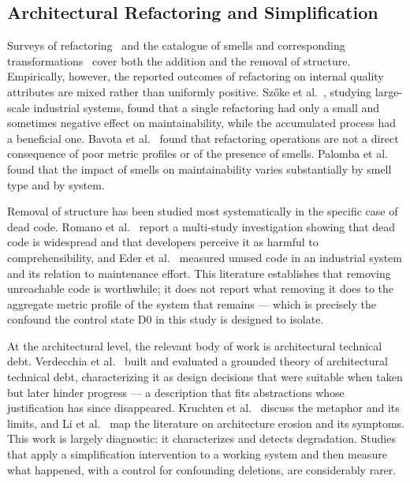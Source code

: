 \documentclass{sbc2019}%
\begin{document}
\subsection{Architectural Refactoring and Simplification}

Surveys of refactoring~\cite{mens2004} and the catalogue of smells and
corresponding transformations~\cite{fowler2018} cover both the addition and the
removal of structure. Empirically, however, the reported outcomes of refactoring
on internal quality attributes are mixed rather than uniformly positive.
Sz\H{o}ke et al.\ \cite{szoke2017}, studying large-scale industrial systems,
found that a single refactoring had only a small and sometimes negative effect
on maintainability, while the accumulated process had a beneficial one. Bavota
et al.\ \cite{bavota2015} found that refactoring operations are not a direct
consequence of poor metric profiles or of the presence of smells. Palomba et
al.\ \cite{palomba2018} found that the impact of smells on maintainability
varies substantially by smell type and by system.

Removal of structure has been studied most systematically in the specific case
of dead code. Romano et al.\ \cite{romano2020} report a multi-study
investigation showing that dead code is widespread and that developers perceive
it as harmful to comprehensibility, and Eder et al.\ \cite{eder2012} measured
unused code in an industrial system and its relation to maintenance effort.
This literature establishes that removing unreachable code is worthwhile; it
does not report what removing it does to the aggregate metric profile of the
system that remains --- which is precisely the confound the control state D0 in
this study is designed to isolate.

At the architectural level, the relevant body of work is architectural
technical debt. Verdecchia et al.\ \cite{verdecchia2020,verdecchia2021} built
and evaluated a grounded theory of architectural technical debt, characterizing
it as design decisions that were suitable when taken but later hinder progress
--- a description that fits abstractions whose justification has since
disappeared. Kruchten et al.\ \cite{kruchten2012} discuss the metaphor and its
limits, and Li et al.\ \cite{li2022} map the literature on architecture erosion
and its symptoms. This work is largely diagnostic: it characterizes and detects
degradation. Studies that apply a simplification intervention to a working
system and then measure what happened, with a control for confounding
deletions, are considerably rarer.
\end{document}
